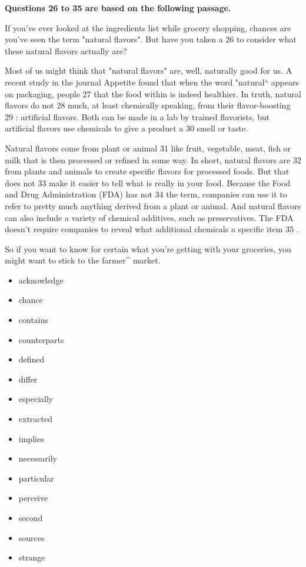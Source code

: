 \documentclass[UTF8,11pt]{ctexart}
\begin{document}
\textbf{Questions 26 to 35 are based on the following passage.}


If you've ever looked at the ingredients list while grocery shopping, chances are you've seen the term "natural flavors". But have you taken a 26 to consider what these natural flavors actually are?


Most of us might think that "natural flavors" are, well, naturally good for us. A recent study in the journal Appetite found that when the word "natural“ appears on packaging, people 27 that the food within is indeed healthier. In truth, natural flavors do not 28 much, at least chemically speaking, from their flavor-boosting 29 : artificial flavors. Both can be made in a lab by trained flavorists, but artificial flavors use chemicals to give a product a 30 smell or taste.


Natural flavors come from plant or animal 31 like fruit, vegetable, meat, fish or milk that is then processed or refined in some way. In short, natural flavors are 32 from plants and animals to create specific flavors for processed foods. But that does not 33 make it easier to tell what is really in your food. Because the Food and Drug Administration (FDA) has not 34 the term, companies can use it to refer to pretty much anything derived from a plant or animal. And natural flavors can also include a variety of chemical additives, such as preservatives. The FDA doesn't require companies to reveal what additional chemicals a specific item 35 .


So if you want to know for certain what you're getting with your groceries, you might want to stick to the farmer\textasciicircum{} market.


\begin{itemize}[leftmargin=2em,itemsep=.2em,topsep=.4em]\item[A.] acknowledge
\item[B.] chance
\item[C.] contains
\item[D.] counterparts
\item[E.] defined
\item[F.] differ
\item[G.] especially
\item[H.] extracted
\item[I.] implies
\item[J.] necessarily
\item[K.] particular
\item[L.] perceive
\item[M.] second
\item[N.] sources
\item[O.] strange
\end{itemize}
\end{document}
